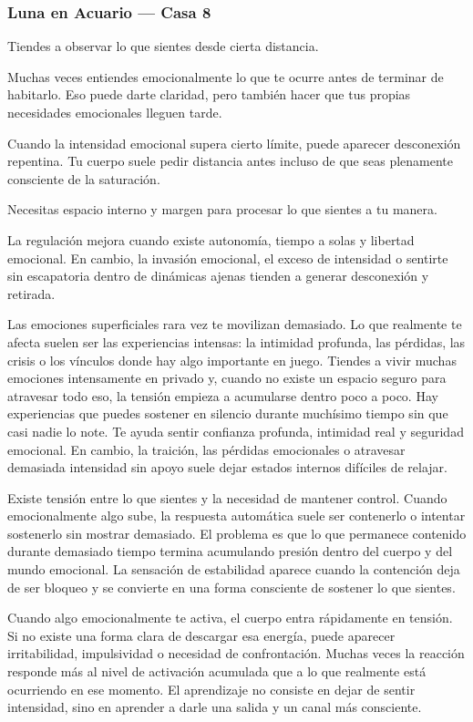 \documentclass[11pt,a4paper]{article}
\begin{document}
\subsubsection*{Luna en Acuario — Casa 8}

Tiendes a observar lo que sientes desde cierta distancia.

Muchas veces entiendes emocionalmente lo que te ocurre antes de terminar de habitarlo. Eso puede darte claridad, pero también hacer que tus propias necesidades emocionales lleguen tarde.

Cuando la intensidad emocional supera cierto límite, puede aparecer desconexión repentina. Tu cuerpo suele pedir distancia antes incluso de que seas plenamente consciente de la saturación.

Necesitas espacio interno y margen para procesar lo que sientes a tu manera.

La regulación mejora cuando existe autonomía, tiempo a solas y libertad emocional. En cambio, la invasión emocional, el exceso de intensidad o sentirte sin escapatoria dentro de dinámicas ajenas tienden a generar desconexión y retirada.

Las emociones superficiales rara vez te movilizan demasiado. Lo que realmente te afecta suelen ser las experiencias intensas: la intimidad profunda, las pérdidas, las crisis o los vínculos donde hay algo importante en juego. Tiendes a vivir muchas emociones intensamente en privado y, cuando no existe un espacio seguro para atravesar todo eso, la tensión empieza a acumularse dentro poco a poco. Hay experiencias que puedes sostener en silencio durante muchísimo tiempo sin que casi nadie lo note. Te ayuda sentir confianza profunda, intimidad real y seguridad emocional. En cambio, la traición, las pérdidas emocionales o atravesar demasiada intensidad sin apoyo suele dejar estados internos difíciles de relajar.

Existe tensión entre lo que sientes y la necesidad de mantener control. Cuando emocionalmente algo sube, la respuesta automática suele ser contenerlo o intentar sostenerlo sin mostrar demasiado. El problema es que lo que permanece contenido durante demasiado tiempo termina acumulando presión dentro del cuerpo y del mundo emocional. La sensación de estabilidad aparece cuando la contención deja de ser bloqueo y se convierte en una forma consciente de sostener lo que sientes.

Cuando algo emocionalmente te activa, el cuerpo entra rápidamente en tensión. Si no existe una forma clara de descargar esa energía, puede aparecer irritabilidad, impulsividad o necesidad de confrontación. Muchas veces la reacción responde más al nivel de activación acumulada que a lo que realmente está ocurriendo en ese momento. El aprendizaje no consiste en dejar de sentir intensidad, sino en aprender a darle una salida y un canal más consciente.
\end{document}
